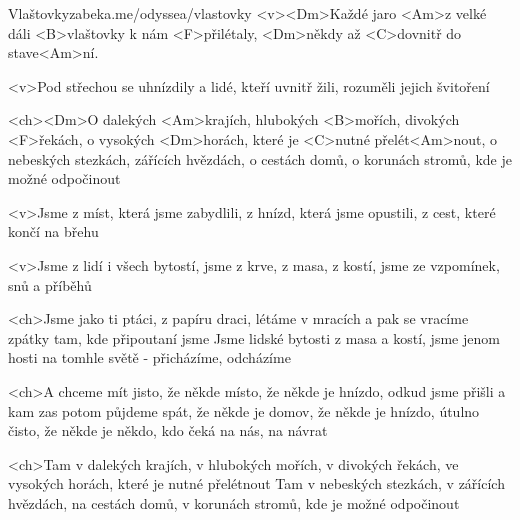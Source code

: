 \begin{song}[Traband]{65}{Vlaštovky}{zabeka.me/odyssea/vlastovky}
<v><Dm>Každé jaro <Am>z velké dáli
<B>vlaštovky k nám <F>přilétaly,
<Dm>někdy až <C>dovnitř do stave<Am>ní.

<v>Pod střechou se uhnízdily
a lidé, kteří uvnitř žili,
rozuměli jejich švitoření

<ch><Dm>O dalekých <Am>krajích, hlubokých <B>mořích, divokých <F>řekách,
o vysokých <Dm>horách, které je <C>nutné přelét<Am>nout,
o nebeských stezkách, zářících hvězdách, o cestách domů,
o korunách stromů, kde je možné odpočinout

<v>Jsme z míst, která jsme zabydlili,
z hnízd, která jsme opustili,
z cest, které končí na břehu

<v>Jsme z lidí i všech bytostí,
jsme z krve, z masa, z kostí,
jsme ze vzpomínek, snů a příběhů

<ch>Jsme jako ti ptáci, z papíru draci, létáme v mracích
a pak se vracíme zpátky tam, kde připoutaní jsme
Jsme lidské bytosti z masa a kostí, jsme jenom hosti
na tomhle světě - přicházíme, odcházíme

<ch>A chceme mít jisto, že někde místo, že někde je hnízdo,
odkud jsme přišli a kam zas potom půjdeme spát,
že někde je domov, že někde je hnízdo, útulno čisto,
že někde je někdo, kdo čeká na nás, na návrat

<ch>Tam v dalekých krajích, v hlubokých mořích, v divokých řekách,
ve vysokých horách, které je nutné přelétnout
Tam v nebeských stezkách, v zářících hvězdách, na cestách domů,
v korunách stromů, kde je možné odpočinout 

\end{song}
